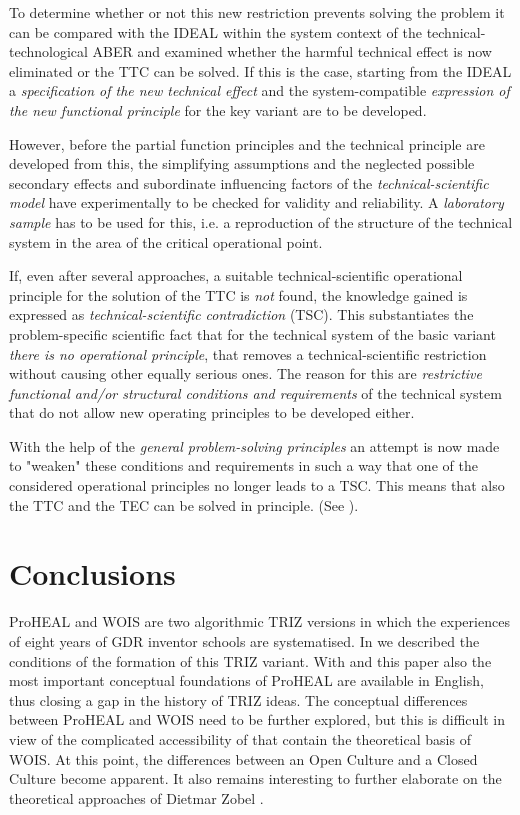 \documentclass[11pt,a4paper]{article}
\begin{document}
To determine whether or not this new restriction prevents solving the problem
it can be compared with the IDEAL within the system context of the
technical-technological ABER and examined whether the harmful technical effect
is now eliminated or the TTC can be solved.  If this is the case, starting
from the IDEAL a \emph{specification of the new technical effect} and the
system-compatible \emph{expression of the new functional principle} for the
key variant are to be developed.

However, before the partial function principles and the technical principle
are developed from this, the simplifying assumptions and the neglected
possible secondary effects and subordinate influencing factors of the
\emph{technical-scientific model} have experimentally to be checked for
validity and reliability.  A \emph{laboratory sample} has to be used for this,
i.e. a reproduction of the structure of the technical system in the area of
the critical operational point.

If, even after several approaches, a suitable technical-scientific operational
principle for the solution of the TTC is \emph{not} found, the knowledge
gained is expressed as \emph{technical-scientific contradiction} (TSC). This
substantiates the problem-specific scientific fact that for the technical
system of the basic variant \emph{there is no operational principle}, that
removes a technical-scientific restriction without causing other equally
serious ones.  The reason for this are \emph{restrictive functional and/or
  structural conditions and requirements} of the technical system that do not
allow new operating principles to be developed either.

With the help of the \emph{general problem-solving principles} an attempt is
now made to "weaken" these conditions and requirements in such a way that one
of the considered operational principles no longer leads to a TSC.  This means
that also the TTC and the TEC can be solved in principle. (See
\cite[A.9]{RM-21}).

\section{Conclusions}

ProHEAL and WOIS are two algorithmic TRIZ versions in which the experiences of
eight years of GDR inventor schools are systematised. In \cite{Graebe2019b} we
described the conditions of the formation of this TRIZ variant. With
\cite{ProHEAL-21} and this paper also the most important conceptual
foundations of ProHEAL are available in English, thus closing a gap in the
history of TRIZ ideas. The conceptual differences between ProHEAL and WOIS
need to be further explored, but this is difficult in view of the complicated
accessibility of \cite{Linde1988, LindeHill1993} that contain the theoretical
basis of WOIS. At this point, the differences between an Open Culture and a
Closed Culture become apparent. It also remains interesting to further
elaborate on the theoretical approaches of Dietmar Zobel
\cite{Zobel2001,Zobel2006,Zobel2007,Zobel2009}.
\end{document}
